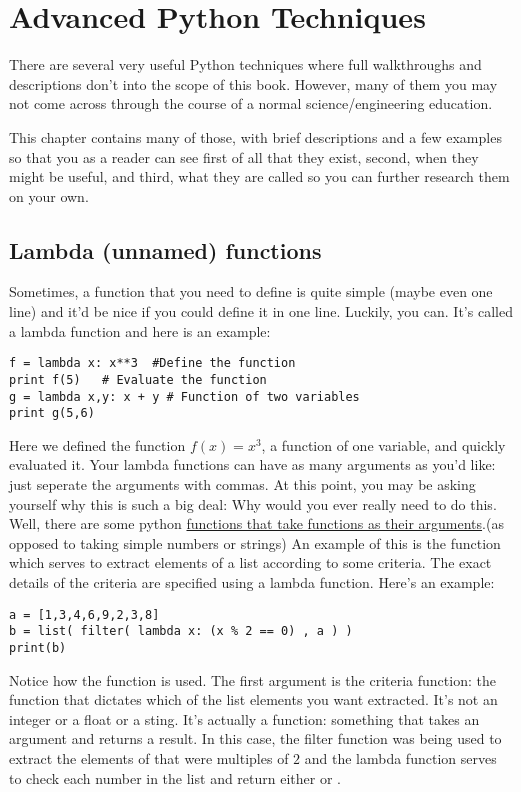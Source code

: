 \chapter[Advanced Python]{Advanced Python Techniques}
There are several very useful Python techniques where full walkthroughs and descriptions don't into the scope of this book.  However, many of them you may not come across through the course of a normal science/engineering education.

This chapter contains many of those, with brief descriptions and a few examples so that you as a reader can see first of all that they exist, second, when they might be useful, and third, what they are called so you can further research them on your own.

\section{Lambda (unnamed) functions}
Sometimes, a function that you need to
define is quite simple (maybe even one line) and it'd be nice if you
could define it in one line.  Luckily, you can.  It's
called a lambda function and here is an example:
\begin{Verbatim}
f = lambda x: x**3  #Define the function
print f(5)   # Evaluate the function
g = lambda x,y: x + y # Function of two variables
print g(5,6)
\end{Verbatim}
Here we defined the function $f(x) = x^3$, a function of one variable,
and quickly evaluated it.  Your lambda functions can have as many
arguments as you'd like: just seperate the arguments with commas.  At
this point, you may be asking yourself why this is such a big deal:
Why would you ever really need to do this.  Well, there are some
python \underline{functions that take functions as their
  arguments}.(as opposed
to taking simple numbers or strings) An example of this is the
 function which serves to extract elements of a list
according to some criteria.  The exact details of the criteria are
specified using a lambda function.  Here's an example:
\begin{Verbatim}
a = [1,3,4,6,9,2,3,8]
b = list( filter( lambda x: (x % 2 == 0) , a ) )
print(b)
\end{Verbatim}
Notice how the  function is used.  The first argument
is the criteria function: the function that dictates which of the list
elements you want extracted. It's not an integer or a float or a
sting.  It's actually a function: something that takes an argument and
returns a result.  In this case, the filter function was being used to
extract the elements of  that were multiples of $2$ and the
lambda function serves to check each number in the list and return
either  or .

